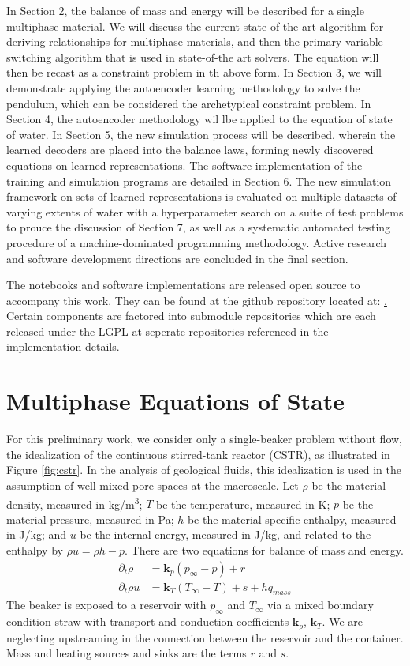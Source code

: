 \documentclass[AMA,STIX1COL]{WileyNJD-v2}
\begin{document}
In Section 2, the balance of mass and energy will be described for a
single multiphase material. We will discuss the current state of the
art algorithm for deriving relationships for multiphase materials, and
then the primary-variable switching algorithm that is used in
state-of-the art solvers. The equation will then be recast as a
constraint problem in th above form.
In Section 3, we will demonstrate applying the autoencoder learning
methodology to solve the pendulum,
which can be considered the archetypical constraint problem.
In Section 4, the autoencoder methodology wil lbe applied to the
equation of state of water. In Section 5, the new simulation process
will be described, wherein the learned decoders are placed into the
balance laws, forming newly discovered equations on learned
representations. The software implementation of the training and
simulation programs are detailed in Section 6. The new simulation
framework on sets of learned representations is evaluated on
multiple datasets of varying extents of water with a
hyperparameter search on a suite of test problems to prouce the discussion of Section 7, as
well as a systematic automated testing procedure of a
machine-dominated programming methodology.
Active research and software development directions are
concluded in the final section.

The notebooks and software implementations are released open source to
accompany this work. They can be found at the github repository
located at: \href{https://github.com/afqueiruga/latentsim}.
Certain components are factored into submodule repositories which are
each released under the LGPL at seperate repositories referenced in
the implementation details.

\section{Multiphase Equations of State}


For this preliminary work, we consider only a single-beaker problem
without flow, the idealization of the continuous stirred-tank reactor (CSTR), as illustrated
in Figure \ref{fig:cstr}. 
In the analysis of geological fluids, this idealization is used in the
assumption of well-mixed pore spaces at the macroscale.  Let \(\rho\)
be the material density, measured in \si{kg/m^3}; \(T\) be the
temperature, measured in \si{K}; \(p\) be the material pressure,
measured in \si{Pa}; \(h\) be the material
specific enthalpy, measured in \si{J/kg}; and \(u\) be the internal
energy, measured in \si{J/kg}, and related to the enthalpy by  \(\rho u = \rho h - p\). There are two equations for
balance of mass and energy.
\begin{align}
\partial_t \rho & = \mathbf{k}_p(p_\infty - p) + r\\
\partial_t \rho u & = \mathbf{k}_T(T_\infty-T) + s + h q_{mass}
\end{align}
The beaker is exposed to a reservoir with \(p_\infty\) and \(T_\infty\)
via a mixed boundary condition straw with transport and conduction
coefficients \(\mathbf{k}_p\), \(\mathbf{k}_T\). 
We are neglecting upstreaming in the connection between the reservoir
and the container. Mass and heating
sources and sinks are the terms \(r\) and \(s\).
\end{document}
